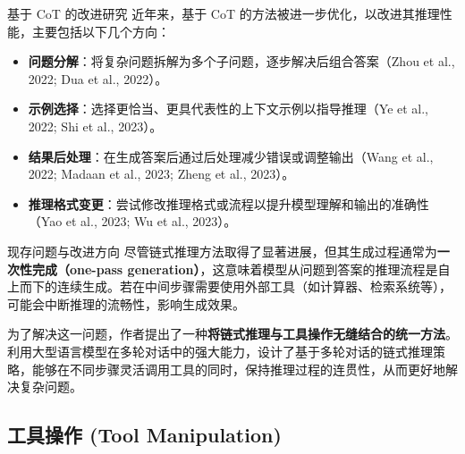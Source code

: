 \begin{frame}{基于 CoT 的改进研究}
    近年来，基于 CoT 的方法被进一步优化，以改进其推理性能，主要包括以下几个方向：
    \begin{itemize}
        \item \textbf{问题分解}：将复杂问题拆解为多个子问题，逐步解决后组合答案（Zhou et al., 2022; Dua et al., 2022）。
        \item \textbf{示例选择}：选择更恰当、更具代表性的上下文示例以指导推理（Ye et al., 2022; Shi et al., 2023）。
        \item \textbf{结果后处理}：在生成答案后通过后处理减少错误或调整输出（Wang et al., 2022; Madaan et al., 2023; Zheng et al., 2023）。
        \item \textbf{推理格式变更}：尝试修改推理格式或流程以提升模型理解和输出的准确性（Yao et al., 2023; Wu et al., 2023）。
    \end{itemize}
\end{frame}

\begin{frame}{现存问题与改进方向}
    尽管链式推理方法取得了显著进展，但其生成过程通常为\textbf{一次性完成（one-pass generation）}，这意味着模型从问题到答案的推理流程是自上而下的连续生成。若在中间步骤需要使用外部工具（如计算器、检索系统等），可能会中断推理的流畅性，影响生成效果。
    
    为了解决这一问题，作者提出了一种\textbf{将链式推理与工具操作无缝结合的统一方法}。利用大型语言模型在多轮对话中的强大能力，设计了基于多轮对话的链式推理策略，能够在不同步骤灵活调用工具的同时，保持推理过程的连贯性，从而更好地解决复杂问题。
\end{frame}


\subsection{工具操作 (Tool Manipulation)}

